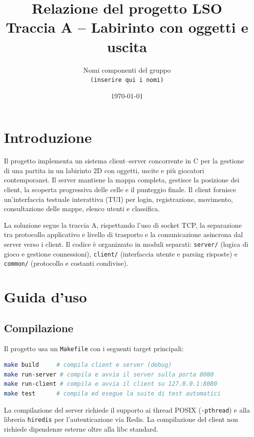 \documentclass[a4paper,11pt]{article}
\title{\textbf{Relazione del progetto LSO}\\
Traccia A -- Labirinto con oggetti e uscita}
\author{
    Nomi componenti del gruppo \\
    \texttt{(inserire qui i nomi)}
}
\date{\today}
\begin{document}
\maketitle

\tableofcontents
\newpage

\section{Introduzione}

Il progetto implementa un sistema client--server concorrente in C per la gestione di
una partita in un labirinto 2D con oggetti, uscite e più giocatori contemporanei.
Il server mantiene la mappa completa, gestisce la posizione dei client, la scoperta
progressiva delle celle e il punteggio finale. Il client fornisce un'interfaccia
testuale interattiva (TUI) per login, registrazione, movimento, consultazione delle
mappe, elenco utenti e classifica.

La soluzione segue la traccia A, rispettando l'uso di socket TCP, la separazione
tra protocollo applicativo e livello di trasporto e la comunicazione asincrona
dal server verso i client. Il codice è organizzato in moduli separati: \texttt{server/}
(logica di gioco e gestione connessioni), \texttt{client/} (interfaccia utente e
parsing risposte) e \texttt{common/} (protocollo e costanti condivise).

\section{Guida d'uso}

\subsection{Compilazione}

Il progetto usa un \texttt{Makefile} con i seguenti target principali:

\begin{lstlisting}[language=bash]
make build     # compila client e server (debug)
make run-server # compila e avvia il server sulla porta 8080
make run-client # compila e avvia il client su 127.0.0.1:8080
make test      # compila ed esegue la suite di test automatici
\end{lstlisting}

La compilazione del server richiede il supporto ai thread POSIX (\texttt{-pthread})
e alla libreria \texttt{hiredis} per l'autenticazione via Redis. La compilazione
del client non richiede dipendenze esterne oltre alla libc standard.
\end{document}
